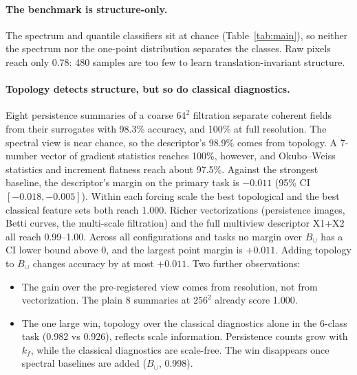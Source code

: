\documentclass[11pt,a4paper]{article}
\begin{document}
\paragraph{The benchmark is structure-only.} The spectrum and quantile
classifiers sit at chance (Table~\ref{tab:main}), so neither the spectrum nor
the one-point distribution separates the classes. Raw pixels reach only 0.78:
480 samples are too few to learn translation-invariant structure.

\paragraph{Topology detects structure, but so do classical diagnostics.} Eight
persistence summaries of a coarse $64^2$ filtration separate coherent fields
from their surrogates with 98.3\% accuracy, and 100\% at full resolution. The
spectral view is near chance, so the descriptor's 98.9\% comes from topology.
A 7-number vector of gradient statistics reaches 100\%, however, and
Okubo--Weiss statistics and increment flatness reach about 97.5\%. Against the
strongest baseline, the descriptor's margin on the primary task is $-0.011$
(95\% CI $[-0.018,-0.005]$). Within each forcing scale the best topological
and the best classical feature sets both reach 1.000. Richer vectorizations (persistence images,
Betti curves, the multi-scale filtration) and the full multiview descriptor
X1+X2 all reach 0.99--1.00. Across all configurations and tasks no margin
over $B_\cup$ has a CI lower bound above 0, and the largest point margin is
$+0.011$. Adding topology to $B_\cup$ changes accuracy by at most $+0.011$.
Two further observations:
\begin{itemize}
\item The gain over the pre-registered view comes from resolution, not from
  vectorization. The plain 8 summaries at $256^2$ already score 1.000.
\item The one large win, topology over the classical diagnostics alone in the
  6-class task (0.982 vs 0.926), reflects scale information. Persistence
  counts grow with $k_f$, while the classical diagnostics are scale-free.
  The win disappears once spectral baselines are added ($B_\cup$, 0.998).
\end{itemize}
\end{document}
